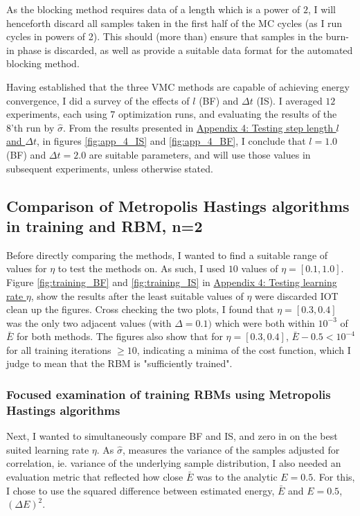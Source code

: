 \documentclass[%
oneside,                 %
final,                   %
10pt]{article}
\begin{document}
As the blocking method requires data of a length which is a power of $2$, I will henceforth discard all samples taken in the first half of the MC cycles (as I run cycles in powers of 2). This should (more than) ensure that samples in the burn-in phase is discarded, as well as provide a suitable data format for the automated blocking method. 

Having established that the three VMC methods are capable of achieving energy convergence, I did a survey of the effects of $l$ (BF) and $\Delta t$ (IS).  I averaged $12$ experiments, each using $7$ optimization runs, and evaluating the results of the 8'th run by $\hat \sigma$. From the results presented in \hyperref[APP_4]{Appendix 4: Testing step length $l$ and $\Delta t$}, in figures
\ref{fig:app_4_IS} and  \ref{fig:app_4_BF}, I conclude that $l=1.0$ (BF) and $\Delta t=2.0$ are suitable parameters, and will use those values in subsequent experiments, unless otherwise stated.
\subsection{Comparison of Metropolis Hastings algorithms in training and RBM, n=2}
Before directly comparing the methods, I wanted to find a suitable range of values for $\eta$ to test the methods on. As such, I used $10$ values of $\eta=[0.1,1.0]$.  Figure \ref{fig:training_BF} and  \ref{fig:training_IS} in \hyperref[APP_4]{Appendix 4: Testing learning rate $\eta$}, show the results after the least suitable values of $\eta$ were discarded IOT clean up the figures. Cross checking the two plots, I found that $\eta=[0.3,0.4]$ was the only two adjacent values (with $\Delta =0.1)$ which were both within $10^{-3}$ of $\bar E$ for both methods. The figures also show that for $\eta=[0.3,0.4]$,  $\bar E-0.5<10^{-4}$ for all training iterations $\geq 10$, indicating a minima of the cost function, which I judge to mean that the RBM is "sufficiently trained". 

\subsubsection{Focused examination of training RBMs using Metropolis Hastings algorithms} \label{Results_focused_MH}
Next, I wanted to simultaneously compare BF and IS, and zero in on the best suited learning rate $\eta$. As $\hat \sigma$, measures the variance of the samples adjusted for correlation, ie. variance of the underlying sample distribution, I also needed an evaluation metric that reflected how close $\bar E$ was to the analytic $E=0.5$. For this, I chose to use the squared difference between estimated energy, $\bar E$ and $E=0.5$, $(\Delta E)^2$. 
\end{document}
